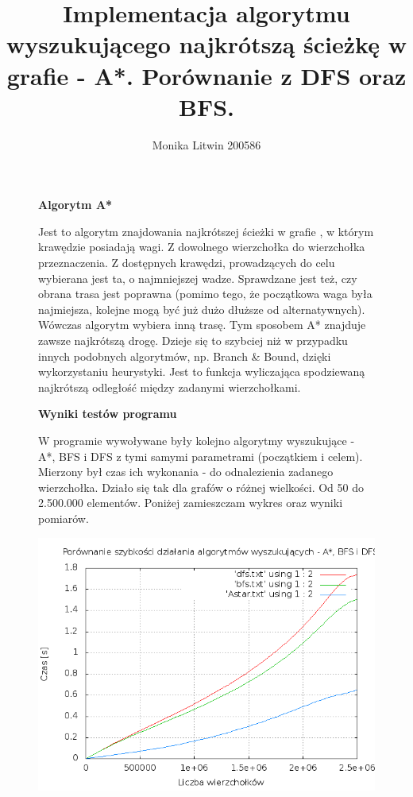 \documentclass[a4paper,11pt]{report}
\title{Implementacja algorytmu wyszukującego najkrótszą ścieżkę w grafie - A*. Porównanie z DFS oraz BFS.}
\author{Monika Litwin 200586}
\begin{document}
\maketitle

\begin{figure}
  \begin{center}
  \textbf{Algorytm A* }
\\
\begin{flushleft}

Jest to algorytm znajdowania najkrótszej ścieżki w grafie , w którym krawędzie posiadają wagi. Z dowolnego wierzchołka do wierzchołka przeznaczenia. Z dostępnych krawędzi, prowadzących do celu wybierana jest ta, o najmniejszej wadze. Sprawdzane jest też, czy obrana trasa jest poprawna (pomimo tego, że początkowa waga była najmiejsza, kolejne mogą być już dużo dłuższe od alternatywnych). Wówczas algorytm wybiera inną trasę. Tym sposobem A* znajduje zawsze najkrótszą drogę. Dzieje się to szybciej niż w przypadku innych podobnych algorytmów, np. Branch \& Bound, dzięki wykorzystaniu heurystyki. Jest to funkcja wyliczająca spodziewaną najkrótszą odległość między zadanymi wierzchołkami.

\end{flushleft}
  \end{center}
\end{figure}

\begin{figure}
  \begin{center}
  \textbf{Wyniki testów programu}
\\
\begin{flushleft}

W programie wywoływane były kolejno algorytmy wyszukujące - A*, BFS i DFS z tymi samymi parametrami (początkiem i celem). Mierzony był czas ich wykonania - do odnalezienia zadanego wierzchołka. Działo się tak dla grafów o różnej wielkości. Od 50 do 2.500.000 elementów. Poniżej zamieszczam wykres oraz wyniki pomiarów.
\begin{center} \includegraphics[scale=0.5]{./graf_przeszukiwanie.png}\end{center}
\end{flushleft}
  \end{center}
\end{figure}
\end{document}
